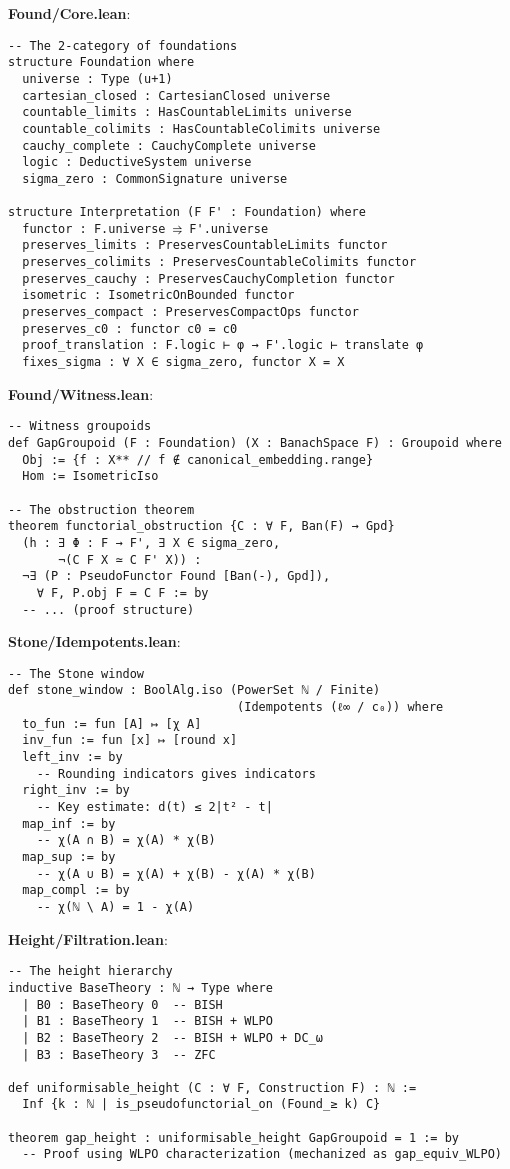 \documentclass[11pt]{article}
\theoremstyle{definition}
\theoremstyle{remark}
\begin{document}
\begin{mdframed}[style=roadmap]
\textbf{Found/Core.lean}:
\begin{verbatim}
-- The 2-category of foundations
structure Foundation where
  universe : Type (u+1)
  cartesian_closed : CartesianClosed universe
  countable_limits : HasCountableLimits universe
  countable_colimits : HasCountableColimits universe
  cauchy_complete : CauchyComplete universe
  logic : DeductiveSystem universe
  sigma_zero : CommonSignature universe

structure Interpretation (F F' : Foundation) where
  functor : F.universe ⥤ F'.universe
  preserves_limits : PreservesCountableLimits functor
  preserves_colimits : PreservesCountableColimits functor
  preserves_cauchy : PreservesCauchyCompletion functor
  isometric : IsometricOnBounded functor
  preserves_compact : PreservesCompactOps functor
  preserves_c0 : functor c0 = c0
  proof_translation : F.logic ⊢ φ → F'.logic ⊢ translate φ
  fixes_sigma : ∀ X ∈ sigma_zero, functor X = X
\end{verbatim}

\textbf{Found/Witness.lean}:
\begin{verbatim}
-- Witness groupoids
def GapGroupoid (F : Foundation) (X : BanachSpace F) : Groupoid where
  Obj := {f : X** // f ∉ canonical_embedding.range}
  Hom := IsometricIso

-- The obstruction theorem
theorem functorial_obstruction {C : ∀ F, Ban(F) → Gpd} 
  (h : ∃ Φ : F → F', ∃ X ∈ sigma_zero, 
       ¬(C F X ≃ C F' X)) :
  ¬∃ (P : PseudoFunctor Found [Ban(-), Gpd]), 
    ∀ F, P.obj F = C F := by
  -- ... (proof structure)
\end{verbatim}

\textbf{Stone/Idempotents.lean}:
\begin{verbatim}
-- The Stone window
def stone_window : BoolAlg.iso (PowerSet ℕ / Finite) 
                                (Idempotents (ℓ∞ / c₀)) where
  to_fun := fun [A] ↦ [χ A]
  inv_fun := fun [x] ↦ [round x]
  left_inv := by
    -- Rounding indicators gives indicators
  right_inv := by  
    -- Key estimate: d(t) ≤ 2|t² - t|
  map_inf := by
    -- χ(A ∩ B) = χ(A) * χ(B)
  map_sup := by
    -- χ(A ∪ B) = χ(A) + χ(B) - χ(A) * χ(B)
  map_compl := by
    -- χ(ℕ \ A) = 1 - χ(A)
\end{verbatim}

\textbf{Height/Filtration.lean}:
\begin{verbatim}
-- The height hierarchy
inductive BaseTheory : ℕ → Type where
  | B0 : BaseTheory 0  -- BISH
  | B1 : BaseTheory 1  -- BISH + WLPO
  | B2 : BaseTheory 2  -- BISH + WLPO + DC_ω
  | B3 : BaseTheory 3  -- ZFC

def uniformisable_height (C : ∀ F, Construction F) : ℕ :=
  Inf {k : ℕ | is_pseudofunctorial_on (Found_≥ k) C}

theorem gap_height : uniformisable_height GapGroupoid = 1 := by
  -- Proof using WLPO characterization (mechanized as gap_equiv_WLPO)
\end{verbatim}
\end{mdframed}
\end{document}
